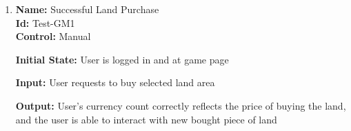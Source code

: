 \documentclass[12pt, titlepage]{article}
\begin{document}
\begin{enumerate}




					
					
					



					
					
					






\item{\textbf{Name:} Successful Land Purchase\\} %
\textbf{Id:} Test-GM1 \label{Test-GM1}\\

\textbf{Control:} Manual
					
\textbf{Initial State:} User is logged in and at game page
					
\textbf{Input:} User requests to buy selected land area
					
\textbf{Output:} User's currency count correctly reflects the price of buying the land, and the user is able to interact with new bought piece of land


\end{enumerate}
\end{document}
